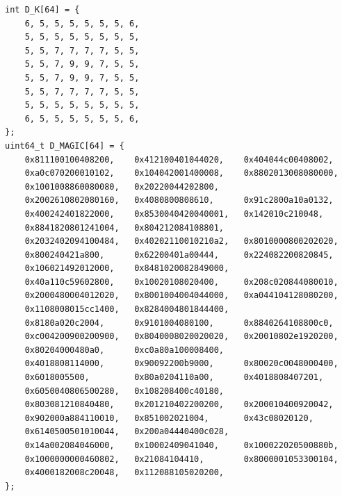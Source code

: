 \documentclass[12pt,a4paper,twoside,openright]{book}
\begin{document}
\begin{mdframed}[skipabove=\baselineskip,skipbelow=0pt,hidealllines=true,backgroundcolor=black!3,innerleftmargin=10pt,innerrightmargin=5pt,innertopmargin=0pt,innerbottommargin=5pt]
\begin{verbatim}
int D_K[64] = {
    6, 5, 5, 5, 5, 5, 5, 6,
    5, 5, 5, 5, 5, 5, 5, 5,
    5, 5, 7, 7, 7, 7, 5, 5,
    5, 5, 7, 9, 9, 7, 5, 5,
    5, 5, 7, 9, 9, 7, 5, 5,
    5, 5, 7, 7, 7, 7, 5, 5,
    5, 5, 5, 5, 5, 5, 5, 5,
    6, 5, 5, 5, 5, 5, 5, 6,
};
uint64_t D_MAGIC[64] = {
    0x811100100408200,    0x412100401044020,    0x404044c00408002,
    0xa0c070200010102,    0x104042001400008,    0x8802013008080000,
    0x1001008860080080,   0x20220044202800,
    0x2002610802080160,   0x4080800808610,      0x91c2800a10a0132,
    0x400242401822000,    0x8530040420040001,   0x142010c210048,
    0x8841820801241004,   0x804212084108801,
    0x2032402094100484,   0x40202110010210a2,   0x8010000800202020,
    0x800240421a800,      0x62200401a00444,     0x224082200820845,
    0x106021492012000,    0x8481020082849000,
    0x40a110c59602800,    0x10020108020400,     0x208c020844080010,
    0x2000480004012020,   0x8001004004044000,   0xa044104128080200,
    0x1108008015cc1400,   0x8284004801844400,
    0x8180a020c2004,      0x9101004080100,      0x8840264108800c0,
    0xc004200900200900,   0x8040008020020020,   0x20010802e1920200,
    0x80204000480a0,      0xc0a80a100008400,
    0x4018808114000,      0x90092200b9000,      0x80020c0048000400,
    0x6018005500,         0x80a0204110a00,      0x4018808407201,
    0x6050040806500280,   0x108208400c40180,
    0x803081210840480,    0x201210402200200,    0x200010400920042,
    0x902000a884110010,   0x851002021004,       0x43c08020120,
    0x6140500501010044,   0x200a04440400c028,
    0x14a002084046000,    0x10002409041040,     0x100022020500880b,
    0x1000000000460802,   0x21084104410,        0x8000001053300104,
    0x4000182008c20048,   0x112088105020200,
};
\end{verbatim}
\end{mdframed}
\begin{mdframed}[skipabove=0pt,skipbelow=\baselineskip,hidealllines=true,innerleftmargin=10pt,innerrightmargin=5pt,innertopmargin=3pt,innerbottommargin=3pt]
\label{lst:find_magic_exec}
\end{mdframed}
\end{document}
